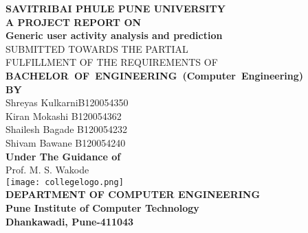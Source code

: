 \documentclass[oneside,a4paper,12pt]{book}
\begin{document}
\setlength{\parindent}{0mm}
\begin{center}
{\bfseries SAVITRIBAI PHULE PUNE UNIVERSITY \\}
 \vspace*{1\baselineskip}
{\bfseries A  PROJECT REPORT ON \\}
 \vspace*{2\baselineskip}
{\bfseries \fontsize{16}{12} \selectfont  Generic user activity analysis and prediction \\ \vspace*{2\baselineskip}}
{\fontsize{12}{12} \selectfont SUBMITTED TOWARDS THE PARTIAL
 \\ FULFILLMENT OF THE REQUIREMENTS OF \\

\vspace*{2\baselineskip}}
{\bfseries \fontsize{14}{12} \selectfont \mbox{BACHELOR OF ENGINEERING (Computer
Engineering)} \\
\vspace*{1\baselineskip}} 
{\bfseries \fontsize{14}{12} \selectfont BY \\ 
\vspace*{1\baselineskip}} 
Shreyas Kulkarni\hspace{25 mm}B120054350\\
Kiran  Mokashi    \hspace{25 mm}  B120054362  \\
Shailesh Bagade \hspace{25 mm}B120054232   \\
Shivam  Bawane  \hspace{25 mm}  B120054240  \\

\vspace*{2\baselineskip}
{\bfseries \fontsize{14}{12} \selectfont Under The Guidance of \\  
\vspace*{2\baselineskip}} 
Prof. M. S. Wakode\\
\vskip 1cm
\texttt{[image: collegelogo.png]} \\
\vskip 0.5cm
{\bfseries \fontsize{14}{12} \selectfont 
DEPARTMENT OF COMPUTER ENGINEERING\\
Pune Institute of Computer Technology \\
Dhankawadi, Pune-411043 
}
\end{center}

\newpage
\end{document}
